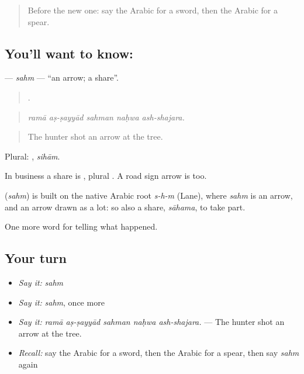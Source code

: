 \label{lesson:AR-C326-sahm}



\begin{quote}
Before the new one: say the Arabic for a sword, then the Arabic for a spear.
\end{quote}

\subsection*{You'll want to know: }
\textbf{} — \emph{sahm} — \textquotedblleft{}an arrow; a share\textquotedblright{}.

\begin{quote}
    .
\end{quote}

\begin{quote}
\emph{ramā aṣ-ṣayyād sahman naḥwa ash-shajara.}
\end{quote}

\begin{quote}
The hunter shot an arrow at the tree.
\end{quote}

Plural: , \emph{sihām}.

In business a share is , plural . A road sign arrow is  too.

\begin{cousinweb}
\textbf{} (\emph{sahm}) is built on the native Arabic root \emph{s-h-m} (Lane), where \emph{sahm} is an arrow, and an arrow drawn as a lot: so also a share, \emph{sāhama}, to take part.
\end{cousinweb}

\begin{grammarlens}[title={What you've built}]
One more word for telling what happened.
\end{grammarlens}

\subsection*{Your turn}
\begin{itemize}
\raggedright
  \item \emph{Say it:} \emph{sahm}
  \item \emph{Say it:} \emph{sahm}, once more
  \item \emph{Say it:} \emph{ramā aṣ-ṣayyād sahman naḥwa ash-shajara.} — The hunter shot an arrow at the tree.
  \item \emph{Recall:} say the Arabic for a sword, then the Arabic for a spear, then say \emph{sahm} again
\end{itemize}

